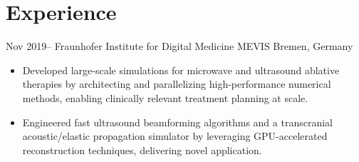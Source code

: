 \documentclass[english, print]{cv-style-wide}
\begin{document}
\section{Experience}
\vspace{-0.2cm}
\begin{entrylist}



\entry
  {Nov 2019--}
  {Fraunhofer Institute for Digital Medicine MEVIS}
  {Bremen, Germany}
  {
  \begin{itemize}[topsep=0pt]
\item Developed large-scale simulations for microwave and ultrasound ablative therapies by architecting and parallelizing high-performance numerical methods, enabling clinically relevant treatment planning at scale.
\item Engineered fast ultrasound beamforming algorithms and a transcranial acoustic/elastic propagation simulator by leveraging GPU-accelerated reconstruction techniques, delivering novel application.
  \end{itemize}}



\end{entrylist}
\end{document}
